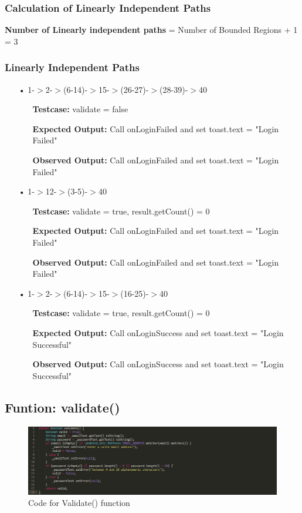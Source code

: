 \documentclass{scrreprt}
\begin{document}
\newpage


\subsubsection{Calculation of Linearly Independent Paths}
\textbf{Number of Linearly independent paths} = Number of Bounded Regions + 1 = 3
\subsubsection{Linearly Independent Paths}
\begin{enumerate}
\item[•]1-$>$2-$>$(6-14)-$>$15-$>$(26-27)-$>$(28-39)-$>$40
\begin{itemize}
\item[]\textbf{Testcase: }validate = false
\item[]\textbf{Expected Output: }Call onLoginFailed and set toast.text = "Login Failed"
\item[]\textbf{Observed Output: }Call onLoginFailed and set toast.text = "Login Failed"
\end{itemize}

\item[•]1-$>$12-$>$(3-5)-$>$40
\begin{itemize}
\item[]\textbf{Testcase: }validate = true, result.getCount() = 0
\item[]\textbf{Expected Output: }Call onLoginFailed and set toast.text = "Login Failed"
\item[]\textbf{Observed Output: }Call onLoginFailed and set toast.text = "Login Failed"
\end{itemize}

\item[•]1-$>$2-$>$(6-14)-$>$15-$>$(16-25)-$>$40
\begin{itemize}
\item[]\textbf{Testcase: }validate = true, result.getCount() = 0
\item[]\textbf{Expected Output: }Call onLoginSuccess and set toast.text = "Login Successful"
\item[]\textbf{Observed Output: }Call onLoginSuccess and set toast.text = "Login Successful"
\end{itemize}
\end{enumerate}	

\subsection{Funtion: validate()}
\begin{figure}[H]
\centering
\includegraphics[width=\textwidth, keepaspectratio]{validateLoginCode.png}
\caption{Code for Validate() function}
\end{figure}
\end{document}
